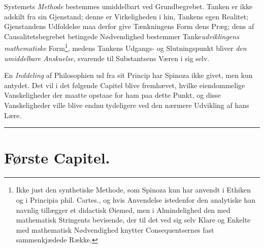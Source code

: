 \documentclass[12pt,a4paper]{book}
\newcommand{\opage}[1]{\marginnote{\footnotesize\textit{[#1]}}}
\begin{document}
Systemets \emph{Methode} bestemmes umiddelbart ved Grundbegrebet. Tanken
er ikke adskilt fra sin Gjenstand; denne er Virkeligheden i hin, Tankens
egen Realitet; Gjenstandens Udfoldelse maa derfor give Tænkningens Form
dens Præg; dens af Causalitetsbegrebet betingede Nødvendighed bestemmer
Tanke\emph{udviklingens mathematiske} Form\footnote{Ikke just den
synthetiske Methode, som Spinoza kun har anvendt i Ethiken og i Principia
phil. Cartes., og hvis Anvendelse istedenfor den analytiske han navnlig
tillægger et didactisk Øiemed, men i Almindelighed den med mathematisk
Stringents bevisende, der til det ved sig selv Klare og Enkelte med
mathematisk Nødvendighed knytter Consequentsernes fast sammenkjædede
Række.},
\opage{26} medens Tankens Udgangs- og Slutningspunkt bliver \emph{den umiddelbare
Anskuelse}, svarende til Substantsens Væren i sig selv.

En \emph{Inddeling} af Philosophien ud fra sit Princip har Spinoza ikke
givet, men kun antydet. Det vil i det følgende Capitel blive fremhævet,
hvilke eiendommelige Vanskeligheder der maatte opstaae for ham paa dette
Punkt, og disse Vanskeligheder ville blive endnu tydeligere ved den
nærmere Udvikling af hans Lære.

\bigskip
\begin{center}\rule{2.5cm}{0.4pt}\end{center}

\newpage

\chapter*{Første Capitel.}
\end{document}
